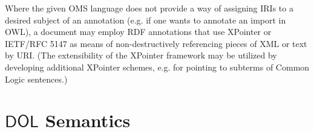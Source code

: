 \documentclass[10pt,fleqn,final]{scrreprt}
\makeatletter
\newcommand*{\eg}{e.g.\@\xspace}
\newcommand*{\CL}{\ensuremath{\mathsf{CL}}\xspace}
\newcommand*{\DOL}{\ensuremath{\mathsf{DOL}}\xspace}
\newcommand{\clause}[1]{\chapter{#1}}
\newcommand{\nisref}[1]{#1}
\newenvironment{definitions}[0]{\medskip }{}
\makeatother
\begin{document}
\begin{definitions}
Where the given OMS language does not provide a way of assigning IRIs to a desired subject of an annotation (\eg if one wants to annotate an import in OWL), a document may employ RDF annotations that use XPointer or \nisref{IETF/RFC 5147} as means of non-destructively referencing pieces of XML or text by URI. { (The extensibility of the XPointer framework may be utilized by developing additional XPointer schemes, \eg for pointing to subterms of Common Logic sentences.)}

\clause{\DOL Semantics}\label{c:semantics}

%
%



\end{definitions}
\end{document}
